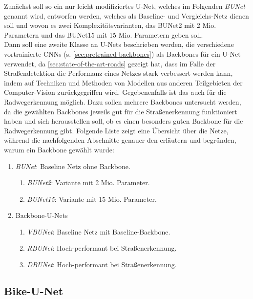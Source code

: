 \renewcommand{\labelenumii}{\theenumii}
\renewcommand{\theenumii}{\theenumi.\arabic{enumii}.}

Zunächst soll so ein nur leicht modifiziertes U-Net, welches im Folgenden \textit{\acf{BUNet}} 
genannt wird, entworfen werden, welches als Baseline- und Vergleichs-Netz dienen soll und 
wovon es zwei Komplexitätsvarianten, das \ac{BUNet2} mit 2 Mio. Parametern und das \ac{BUNet15} 
mit 15 Mio. Parametern geben soll. \\
Dann soll eine zweite Klasse an U-Nets beschrieben werden, die verschiedene vortrainierte \acp{CNN} (s. \autoref{sec:pretrained-backbones}) 
als Backbones für ein U-Net verwendet, da \autoref{sec:state-of-the-art-roads} gezeigt hat, 
dass im Falle der Straßendetektion die Performanz eines Netzes stark verbessert werden kann, 
indem auf Techniken und Methoden von Modellen aus anderen Teilgebieten der Computer-Vision 
zurückgegriffen wird. 
Gegebenenfalls ist das auch für die Radwegerkennung möglich. Dazu sollen mehrere Backbones untersucht werden, 
da die gewählten Backbones jeweils gut für die Straßenerkennung funktioniert haben und sich 
herausstellen soll, ob es einen besonders guten Backbone für die Radwegerkennung gibt. 
Folgende Liste zeigt eine Übersicht über die Netze, während die nachfolgenden Abschnitte genauer 
den erläutern und begründen, warum ein Backbone gewählt wurde: 
\begin{enumerate}
	\item \textit{\acf{BUNet}}: Baseline Netz ohne Backbone.
	\begin{enumerate}
		\item \textit{\acf{BUNet2}}: Variante mit 2 Mio. Parameter.
		\item \textit{\acf{BUNet15}}: Variante mit 15 Mio. Parameter.
	\end{enumerate}
	\item Backbone-U-Nets
	\begin{enumerate}
		\item \textit{\acf{VBUNet}}: Baseline Netz mit Baseline-Backbone.
		\item \textit{\acf{RBUNet}}: Hoch-performant bei Straßenerkennung.
		\item \textit{\acf{DBUNet}}: Hoch-performant bei Straßenerkennung.
	\end{enumerate}
\end{enumerate} 

\subsection{Bike-U-Net} \label{sec:architecture:bike-u-net}

